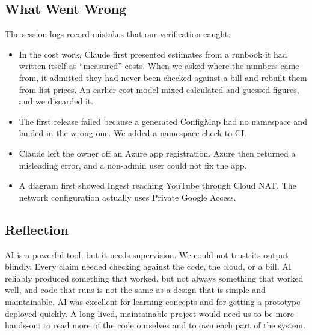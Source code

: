 \documentclass[conference]{IEEEtran}
\begin{document}
\subsection{What Went Wrong}
The session logs record mistakes that our verification caught:
\begin{itemize}
\item In the cost work, Claude first presented estimates from a runbook it
had written itself as ``measured'' costs. When we asked where the numbers
came from, it admitted they had never been checked against a bill and
rebuilt them from list prices. An earlier cost model mixed calculated and
guessed figures, and we discarded it.
\item The first release failed because a generated ConfigMap had no
namespace and landed in the wrong one. We added a namespace check to CI.
\item Claude left the owner off an Azure app registration. Azure then
returned a misleading error, and a non-admin user could not fix the app.
\item A diagram first showed Ingest reaching YouTube through Cloud NAT. The
network configuration actually uses Private Google Access.
\end{itemize}

\subsection{Reflection}
AI is a powerful tool, but it needs supervision. We could not trust its
output blindly. Every claim needed checking against the code, the cloud,
or a bill. AI reliably produced something that worked, but not always
something that worked well, and code that runs is not the same as a
design that is simple and maintainable. AI was excellent for learning
concepts and for getting a prototype deployed quickly. A long-lived,
maintainable project would need us to be more hands-on: to read more of
the code ourselves and to own each part of the system.

\end{document}
